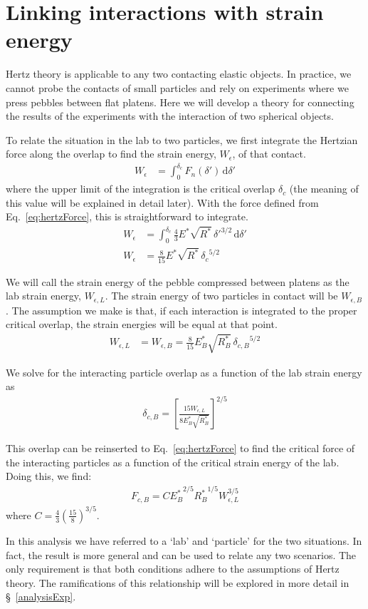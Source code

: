 
\section{Linking interactions with strain energy}\label{theoryStrainEnergy}
Hertz theory is applicable to any two contacting elastic objects. In practice, we cannot probe the contacts of small particles and rely on experiments where we press pebbles between flat platens. Here we will develop a theory for connecting the results of the experiments with the interaction of two spherical objects.

To relate the situation in the lab to two particles, we first integrate the Hertzian force along the overlap to find the strain energy, $W_\epsilon$, of that contact. 
\begin{align}
W_\epsilon & = \int_0^{\delta_c}\!F_n(\delta')\,\mathrm{d}\delta'
\end{align}
where the upper limit of the integration is the critical overlap $\delta_c$ (the meaning of this value will be explained in detail later). With the force defined from Eq.~\ref{eq:hertzForce}, this is straightforward to integrate.
\begin{align}
W_\epsilon& = \int_0^{\delta_c}\!  \frac{4}{3}E^*\sqrt{R^*}\,\delta'^{3/2} \,\mathrm{d}\delta' \\
W_\epsilon & = \frac{8}{15}E^*\sqrt{R^*}\, {\delta_c}^{5/2}
\end{align}

We will call the strain energy of the pebble compressed between platens as the lab strain energy, $W_{\epsilon,L}$. The strain energy of two particles in contact will be $W_{\epsilon,B}$. The assumption we make is that, if each interaction is integrated to the proper critical overlap, the strain energies will be equal at that point.
\begin{align}
W_{\epsilon,L} & = W_{\epsilon,B} = \frac{8}{15}E_B^*\sqrt{R_B^*}\, {\delta_{c,B}}^{5/2}
\end{align}

We solve for the interacting particle overlap as a function of the lab strain energy as
\begin{align}
 \delta_{c,B} = \left[\frac{15W_{\epsilon,L}}{8E_B^*\sqrt{R_B^*}}\right]^{2/5}
\end{align}

This overlap can be reinserted to Eq.~\ref{eq:hertzForce} to find the critical force of the interacting particles as a function of the critical strain energy of the lab. Doing this, we find:
\begin{align}\label{eq:peb_hertz}
F_{c,B} = C{E_B^*}^{2/5}{R_B^*}^{1/5}W_{\epsilon,L}^{3/5}
\end{align}
where $C = \frac{4}{3}\left(\frac{15}{8}\right)^{3/5}$.

In this analysis we have referred to a `lab' and `particle' for the two situations. In fact, the result is more general and can be used to relate any two scenarios. The only requirement is that both conditions adhere to the assumptions of Hertz theory. The ramifications of this relationship will be explored in more detail in \S~\ref{analysisExp}.